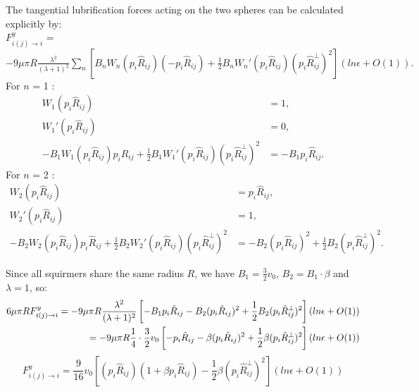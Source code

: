 \documentclass{article}
\begin{document}
The tangential lubrification forces acting on the two spheres can be calculated explicitly by\cite{Brumley}:
\\ 
\footnotesize
$F_{i(j)\rightarrow i}^{y}$ = $-9 \mu \pi R \frac{\lambda ^2}{(\lambda +1)^2} \sum_{n} \left[ B_n W_n(p_i\hat{R}_{ij})(-p_i\hat{R}_{ij}) + \frac{1}{2} B_n W_n'(p_i\hat{R}_{ij})(p_i\hat{R}^{\perp}_{ij})^2 \right] (ln \epsilon + O(1)).$
\normalsize
For $n$ = 1 : \begin{align*}
    W_1(p_i\hat{R}_{ij}) &= 1, \\
    W_1'(p_i\hat{R}_{ij}) &= 0, \\
    -B_1 W_1(p_i\hat{R}_{ij})p_i\hat{R}_{ij} + \frac{1}{2} B_1  W_1'(p_i\hat{R}_{ij}) (p_i\hat{R}^{\perp}_{ij})^2  &= -B_1 p_i\hat{R}_{ij}.
\end{align*} 
For $n$ = 2 : \begin{align*}
    W_2(p_i\hat{R}_{ij}) &= p_i\hat{R}_{ij}, \\
    W_2'(p_i\hat{R}_{ij}) &= 1,\\
    -B_2 W_2(p_i\hat{R}_{ij})p_i\hat{R}_{ij}+ \frac{1}{2} B_2  W_2'(p_i\hat{R}_{ij}) (p_i\hat{R}^{\perp}_{ij})^2  &= -B_2 (p_i\hat{R}_{ij})^2 + \frac{1}{2} B_2(p_i\hat{R}^{\perp}_{ij})^2.
\end{align*}  

Since all squirmers share the same radius $R$, we have $B_1 = \frac{3}{2}v_0$, $B_2 = B_1\cdot\beta$ and $\lambda=1$, so:
\begin{align*}
\footnotesize
6\mu\pi RF_{i(j)\rightarrow i}^{y} = -9 \mu \pi R \frac{\lambda ^2}{(\lambda +1)^2} \left[ -B_1 p_i\hat{R}_{ij} -B_2 (p_i\hat{R}_{ij})^2 + \frac{1}{2} B_2(p_i\hat{R}^{\perp}_{ij})^2\right](ln \epsilon + O(1))\\
= -9 \mu \pi R \frac{1}{4}\cdot\frac{3}{2}v_0\left[ -p_i\hat{R}_{ij} -\beta (p_i\hat{R}_{ij})^2 + \frac{1}{2} \beta(p_i\hat{R}^{\perp}_{ij})^2\right](ln \epsilon + O(1))
\end{align*}
\begin{equation*}
\boxed{
    F_{i(j)\rightarrow i}^{y} = \frac{9}{16}v_0
\left[(p_i\hat{R}_{ij})(1 + \beta p_i\hat{R}_{ij}) - \frac{1}{2}\beta(p_i\hat{R}^{\perp}_{ij})^2\right](ln \epsilon + O(1))
}
\end{equation*}
\normalsize
\vspace{0.5cm}
\end{document}
